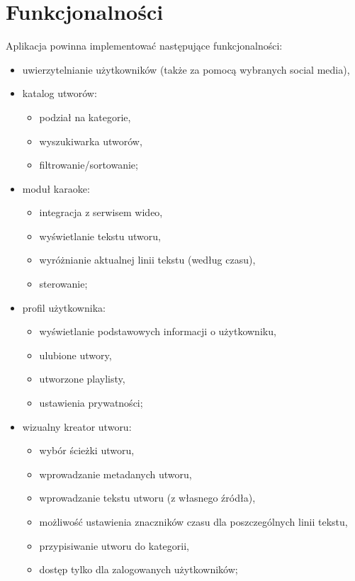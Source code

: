 \documentclass[11pt]{article}
\begin{document}
  \section{Funkcjonalności}
  Aplikacja powinna implementować następujące funkcjonalności:
  \begin{itemize}
    \item uwierzytelnianie użytkowników (także za pomocą wybranych social media),
    \item katalog utworów:
    \begin{itemize}
      \item podział na kategorie,
      \item wyszukiwarka utworów,
      \item filtrowanie/sortowanie;
    \end{itemize}
    \item moduł karaoke:
    \begin{itemize}
      \item integracja z serwisem wideo,
      \item wyświetlanie tekstu utworu,
      \item wyróżnianie aktualnej linii tekstu (według czasu),
      \item sterowanie;
    \end{itemize}
    \item profil użytkownika:
    \begin{itemize}
      \item wyświetlanie podstawowych informacji o użytkowniku,
      \item ulubione utwory,
      \item utworzone playlisty,
      \item ustawienia prywatności;
    \end{itemize}
    \item wizualny kreator utworu:
    \begin{itemize}
      \item wybór ścieżki utworu,
      \item wprowadzanie metadanych utworu,
      \item wprowadzanie tekstu utworu (z własnego źródła),
      \item możliwość ustawienia znaczników czasu dla poszczególnych linii tekstu,
      \item przypisiwanie utworu do kategorii,
      \item dostęp tylko dla zalogowanych użytkowników;
    \end{itemize}

\end{itemize}
\end{document}
